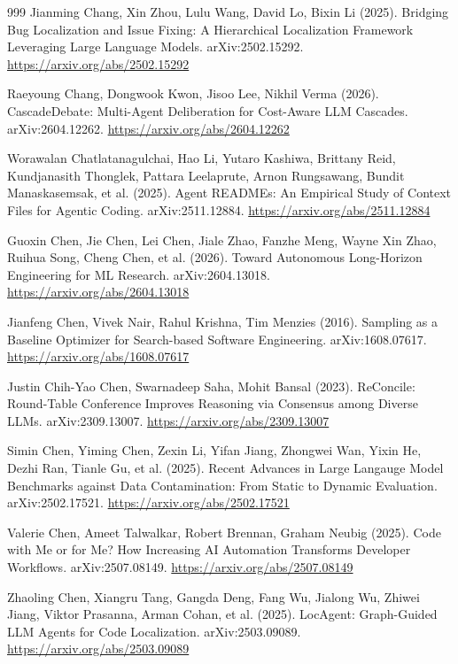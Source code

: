 \begin{thebibliography}{999}
 Jianming Chang, Xin Zhou, Lulu Wang, David Lo, Bixin Li (2025). Bridging Bug Localization and Issue Fixing: A Hierarchical Localization Framework Leveraging Large Language Models. arXiv:2502.15292. \url{https://arxiv.org/abs/2502.15292}

 Raeyoung Chang, Dongwook Kwon, Jisoo Lee, Nikhil Verma (2026). CascadeDebate: Multi-Agent Deliberation for Cost-Aware LLM Cascades. arXiv:2604.12262. \url{https://arxiv.org/abs/2604.12262}

 Worawalan Chatlatanagulchai, Hao Li, Yutaro Kashiwa, Brittany Reid, Kundjanasith Thonglek, Pattara Leelaprute, Arnon Rungsawang, Bundit Manaskasemsak, et al. (2025). Agent READMEs: An Empirical Study of Context Files for Agentic Coding. arXiv:2511.12884. \url{https://arxiv.org/abs/2511.12884}

 Guoxin Chen, Jie Chen, Lei Chen, Jiale Zhao, Fanzhe Meng, Wayne Xin Zhao, Ruihua Song, Cheng Chen, et al. (2026). Toward Autonomous Long-Horizon Engineering for ML Research. arXiv:2604.13018. \url{https://arxiv.org/abs/2604.13018}

 Jianfeng Chen, Vivek Nair, Rahul Krishna, Tim Menzies (2016). Sampling as a Baseline Optimizer for Search-based Software Engineering. arXiv:1608.07617. \url{https://arxiv.org/abs/1608.07617}

 Justin Chih-Yao Chen, Swarnadeep Saha, Mohit Bansal (2023). ReConcile: Round-Table Conference Improves Reasoning via Consensus among Diverse LLMs. arXiv:2309.13007. \url{https://arxiv.org/abs/2309.13007}

 Simin Chen, Yiming Chen, Zexin Li, Yifan Jiang, Zhongwei Wan, Yixin He, Dezhi Ran, Tianle Gu, et al. (2025). Recent Advances in Large Langauge Model Benchmarks against Data Contamination: From Static to Dynamic Evaluation. arXiv:2502.17521. \url{https://arxiv.org/abs/2502.17521}

 Valerie Chen, Ameet Talwalkar, Robert Brennan, Graham Neubig (2025). Code with Me or for Me? How Increasing AI Automation Transforms Developer Workflows. arXiv:2507.08149. \url{https://arxiv.org/abs/2507.08149}

 Zhaoling Chen, Xiangru Tang, Gangda Deng, Fang Wu, Jialong Wu, Zhiwei Jiang, Viktor Prasanna, Arman Cohan, et al. (2025). LocAgent: Graph-Guided LLM Agents for Code Localization. arXiv:2503.09089. \url{https://arxiv.org/abs/2503.09089}


\end{thebibliography}
